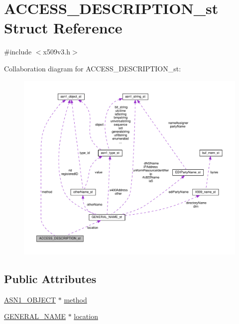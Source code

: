 \hypertarget{struct_a_c_c_e_s_s___d_e_s_c_r_i_p_t_i_o_n__st}{}\section{A\+C\+C\+E\+S\+S\+\_\+\+D\+E\+S\+C\+R\+I\+P\+T\+I\+O\+N\+\_\+st Struct Reference}
\label{struct_a_c_c_e_s_s___d_e_s_c_r_i_p_t_i_o_n__st}


{\ttfamily \#include $<$x509v3.\+h$>$}



Collaboration diagram for A\+C\+C\+E\+S\+S\+\_\+\+D\+E\+S\+C\+R\+I\+P\+T\+I\+O\+N\+\_\+st\+:
\nopagebreak
\begin{figure}[H]
\begin{center}
\leavevmode
\includegraphics[width=350pt]{struct_a_c_c_e_s_s___d_e_s_c_r_i_p_t_i_o_n__st__coll__graph}
\end{center}
\end{figure}
\subsection*{Public Attributes}
\begin{DoxyCompactItemize}
\item 
\hyperlink{asn1_8h_ae10c08e4e6b23f67a39b2add932ec48f}{A\+S\+N1\+\_\+\+O\+B\+J\+E\+CT} $\ast$ \hyperlink{struct_a_c_c_e_s_s___d_e_s_c_r_i_p_t_i_o_n__st_afba634277470759ab5ca872db4693fe1}{method}
\item 
\hyperlink{x509v3_8h_a6688fb8a0c7b8e63f3d47bac3a09eb15}{G\+E\+N\+E\+R\+A\+L\+\_\+\+N\+A\+ME} $\ast$ \hyperlink{struct_a_c_c_e_s_s___d_e_s_c_r_i_p_t_i_o_n__st_ae554d8ab9233f6c313c43fc1de26a4ae}{location}
\end{DoxyCompactItemize}


